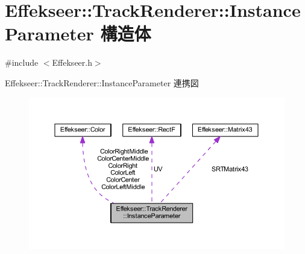 \hypertarget{struct_effekseer_1_1_track_renderer_1_1_instance_parameter}{}\section{Effekseer\+:\+:Track\+Renderer\+:\+:Instance\+Parameter 構造体}
\label{struct_effekseer_1_1_track_renderer_1_1_instance_parameter}


{\ttfamily \#include $<$Effekseer.\+h$>$}



Effekseer\+:\+:Track\+Renderer\+:\+:Instance\+Parameter 連携図\nopagebreak
\begin{figure}[H]
\begin{center}
\leavevmode
\includegraphics[width=350pt]{struct_effekseer_1_1_track_renderer_1_1_instance_parameter__coll__graph}
\end{center}
\end{figure}
